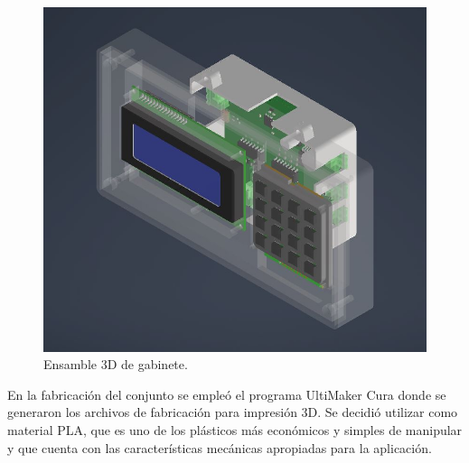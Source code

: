 \begin{figure}[h!]
	\centering
	\includegraphics[scale=.6]{./Figures/asm_3d.JPG}
	\caption{Ensamble 3D de gabinete.}
	\label{fig:ensamble}
\end{figure}

\newpage

En la fabricación del conjunto se empleó el programa UltiMaker Cura \citep{web_cura3d} donde se generaron los archivos de fabricación para impresión 3D. Se decidió utilizar como material PLA, que es uno de los plásticos más económicos y simples de manipular y que cuenta con las características mecánicas apropiadas para la aplicación.